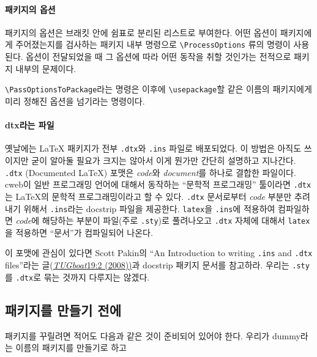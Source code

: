 \documentclass[a4paper,amsmath]{oblivoir}
\newcounter{sub}
\begin{document}
\paragraph{패키지의 옵션}

패키지의 옵션은 브래킷 안에 쉼표로 분리된 리스트로 부여한다. 어떤 옵션이 패키지에게 주어졌는지를
검사하는 패키지 내부 명령으로 \verb|\ProcessOptions| 류의 명령이 사용된다. 
옵션이 전달되었을 때 그 옵션에 따라 어떤 동작을 취할 것인가는 전적으로 패키지 내부의 문제이다.

\verb|\PassOptionsToPackage|라는 명령은 이후에 \verb|\usepackage|할 같은 이름의
패키지에게 미리 정해진 옵션을 넘기라는 명령이다.

\paragraph{dtx라는 파일}

옛날에는 \LaTeX{} 패키지가 전부 \verb|.dtx|와 \verb|.ins| 파일로 배포되었다. 이 방법은 아직도
쓰이지만 굳이 알아둘 필요가 크지는 않아서 이게 뭔가만 간단히 설명하고 지나간다.
\verb|.dtx| (Documented \LaTeX) 포맷은 \emph{code}와 \emph{document}를 하나로 결합한 파일이다. \textsf{cweb}이
일반 프로그래밍 언어에 대해서 동작하는 “문학적 프로그래밍” 툴이라면 \verb|.dtx|는
\LaTeX{}의 문학적 프로그래밍이라고 할 수 있다.
\verb|.dtx| 문서로부터 \emph{code} 부분만 추려내기 위해서 \verb|.ins|라는 docstrip 파일을
제공한다. \verb|latex|을 \verb|.ins|에 적용하여 컴파일하면 \emph{code}에 해당하는 부분이 파일(주로 \verb|.sty|)로 풀려나오고
\verb|.dtx| 자체에 대해서 \verb|latex|을 적용하면 “문서”가 컴파일되어 나온다.

이 포맷에 관심이 있다면 Scott Pakin의 “An Introduction to writing \verb|.ins| and \verb|.dtx| files”라는 글(\href{https://www.tug.org/TUGboat/tb29-2/tb92pakin.pdf}{\emph{TUGboat}19:2 (2008))}과 \textsf{docstrip} 패키지 문서를 참고하라.
우리는 \verb|.sty|를 \verb|.dtx|로 묶는 것까지 다루지는 않겠다.


\subsection{패키지를 만들기 전에}

패키지를 꾸릴려면 적어도 다음과 같은 것이 준비되어 있어야 한다.
우리가 dummy라는 이름의 패키지를 만들기로 하고 
\end{document}
